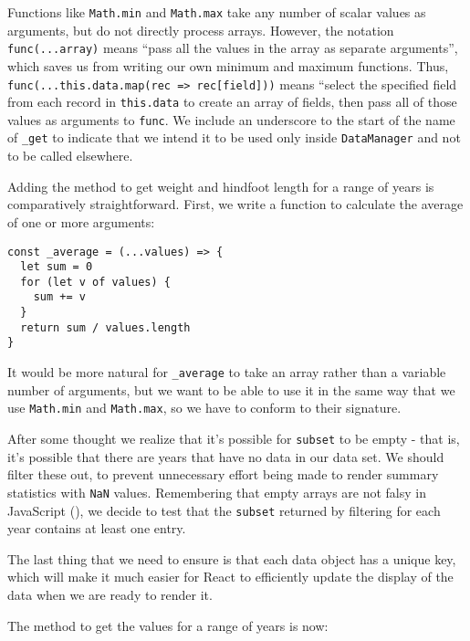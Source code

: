 Functions like \texttt{Math.min} and \texttt{Math.max} take any number of scalar values as arguments,
but do not directly process arrays.
However, the notation \texttt{func(...array)} means
``pass all the values in the array as separate arguments'',
which saves us from writing our own minimum and maximum functions.
Thus,
\texttt{func(...this.data.map(rec\ =\textgreater{}\ rec{[}field{]}))} means
``select the specified field from each record in \texttt{this.data} to create an array of fields,
then pass all of those values as arguments to \texttt{func}.
We include an underscore to the start of the name of \texttt{\_get} to indicate that we
intend it to be used only inside \texttt{DataManager} and not to be called elsewhere.

Adding the method to get weight and hindfoot length for a range of years
is comparatively straightforward.
First,
we write a function to calculate the average of one or more arguments:

\begin{verbatim}
const _average = (...values) => {
  let sum = 0
  for (let v of values) {
    sum += v
  }
  return sum / values.length
}
\end{verbatim}

It would be more natural for \texttt{\_average} to take an array rather than a variable number of arguments,
but we want to be able to use it in the same way that we use \texttt{Math.min} and \texttt{Math.max},
so we have to conform to their signature.

After some thought we realize that it's possible for \texttt{subset} to be empty -
that is, it's possible that there are years that have no data in our data set.
We should filter these out,
to prevent unnecessary effort being made to render summary statistics with \texttt{NaN} values.
Remembering that empty arrays are not falsy in JavaScript (),
we decide to test that the \texttt{subset} returned by filtering for each year
contains at least one entry.

The last thing that we need to ensure is that each data object has a unique key,
which will make it much easier for React to efficiently update the display of
the data when we are ready to render it.

The method to get the values for a range of years is now:

